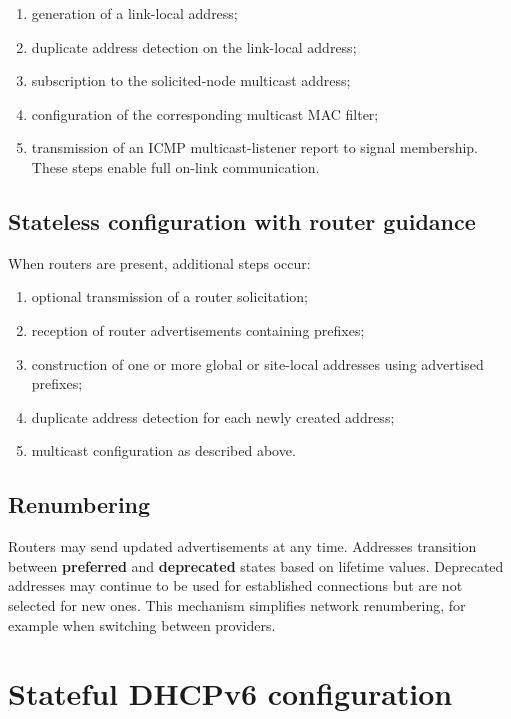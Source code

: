 \documentclass[11pt,a4paper,openany]{report}
\begin{document}
\begin{enumerate}
\item generation of a link-local address;
\item duplicate address detection on the link-local address;
\item subscription to the solicited-node multicast address;
\item configuration of the corresponding multicast MAC filter;
\item transmission of an ICMP multicast-listener report to signal membership. These steps enable full on-link communication.
\end{enumerate}

\subsection{Stateless configuration with router guidance}

When routers are present, additional steps occur:

\begin{enumerate}
\item optional transmission of a router solicitation;
\item reception of router advertisements containing prefixes;
\item construction of one or more global or site-local addresses using advertised prefixes;
\item duplicate address detection for each newly created address;
\item multicast configuration as described above.
\end{enumerate}

\subsection{Renumbering}

Routers may send updated advertisements at any time. Addresses transition between \textbf{preferred} and \textbf{deprecated} states based on lifetime values. Deprecated addresses may continue to be used for established connections but are not selected for new ones. This mechanism simplifies network renumbering, for example when switching between providers.

\section{Stateful DHCPv6 configuration}
\end{document}
